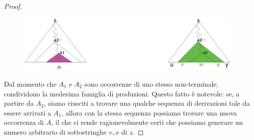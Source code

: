 \documentclass[class=book, crop=false, oneside, 12pt]{standalone}
\begin{document}
\begin{proof}
  \begin{figure}
    \centering
    \includegraphics[width=.8\textwidth,keepaspectratio]{pl-proof_2}
  \end{figure}

  Dal momento che \(A_1\) e \(A_2\) sono occorrenze di uno stesso non-terminale, condividono la medesima famiglia di produzioni. Questo fatto è notevole: se, a partire da \(A_2\), siamo riusciti a trovare una qualche sequenza di derivazioni tale da essere arrivati a \(A_1\), allora con la stessa sequenza possiamo trovare una nuova occorrenza di \(A\), il che ci rende ragionevolmente certi che possiamo generare un numero arbitrario di sottostringhe \(v, x\) di \(z\).


\end{proof}
\end{document}
